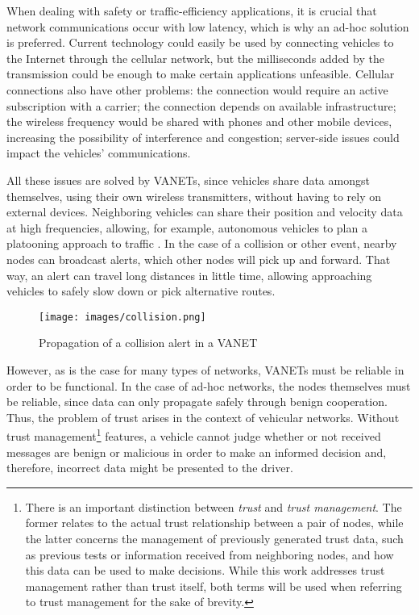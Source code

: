 When dealing with safety or traffic-efficiency applications, it is crucial that network communications occur with low latency, which is why an ad-hoc solution is preferred.
Current technology could easily be used by connecting vehicles to the Internet through the cellular network, but the milliseconds added by the transmission could be enough to make certain applications unfeasible.
Cellular connections also have other problems: the connection would require an active subscription with a carrier; the connection depends on available infrastructure; the wireless frequency would be shared with phones and other mobile devices, increasing the possibility of interference and congestion; server-side issues could impact the vehicles' communications.

All these issues are solved by VANETs, since vehicles share data amongst themselves, using their own wireless transmitters, without having to rely on external devices.
Neighboring vehicles can share their position and velocity data at high frequencies, allowing, for example, autonomous vehicles to plan a platooning approach to traffic \cite{amoozadeh2015platoon}.
In the case of a collision or other event, nearby nodes can broadcast alerts, which other nodes will pick up and forward.
That way, an alert can travel long distances in little time, allowing approaching vehicles to safely slow down or pick alternative routes.

\begin{figure}[h]
    \centering
    \texttt{[image: images/collision.png]}
    \caption{Propagation of a collision alert in a VANET}
    \label{fig:collision}
\end{figure}

However, as is the case for many types of networks, VANETs must be reliable in order to be functional.
In the case of ad-hoc networks, the nodes themselves must be reliable, since data can only propagate safely through benign cooperation.
Thus, the problem of trust arises in the context of vehicular networks.
Without trust management\footnote{There is an important distinction between \textit{trust} and \textit{trust management}.
The former relates to the actual trust relationship between a pair of nodes, while the latter concerns the management of previously generated trust data, such as previous tests or information received from neighboring nodes, and how this data can be used to make decisions.
While this work addresses trust management rather than trust itself, both terms will be used when referring to trust management for the sake of brevity.} features, a vehicle cannot judge whether or not received messages are benign or malicious in order to make an informed decision and, therefore, incorrect data might be presented to the driver.

